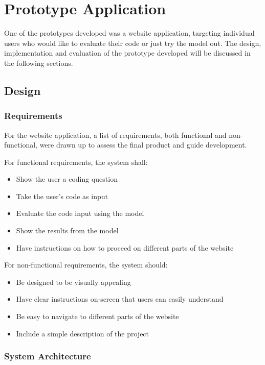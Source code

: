 \documentclass{report}
\begin{document}
\chapter{Prototype Application}

One of the prototypes developed was a website application, targeting individual users who would like to evaluate their code or just try the model out. The design, implementation and evaluation of the prototype developed will be discussed in the following sections.

\section{Design}

\subsection{Requirements}

For the website application, a list of requirements, both functional and non-functional, were drawn up to assess the final product and guide development.

For functional requirements, the system shall:

\begin{itemize}
\item Show the user a coding question
\item Take the user’s code as input
\item Evaluate the code input using the model
\item Show the results from the model
\item Have instructions on how to proceed on different parts of the website
\end{itemize}

For non-functional requirements, the system should:

\begin{itemize}
\item Be designed to be visually appealing
\item Have clear instructions on-screen that users can easily understand
\item Be easy to navigate to different parts of the website
\item Include a simple description of the project
\end{itemize}

\subsection{System Architecture}
\end{document}
